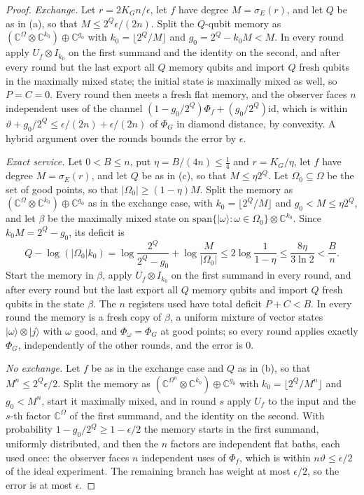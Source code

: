 \begin{proof}
\emph{Exchange.} Let $r=2K_Gn/\epsilon$, let $f$ have degree $M=\sigma_E(r)$, and let $Q$ be as in (a), so that $M\le2^Q\epsilon/(2n)$. Split the
$Q$-qubit memory as $(\mathbb C^\Omega\otimes\mathbb C^{k_0})\oplus\mathbb C^{g_0}$ with $k_0=\lfloor2^Q/M\rfloor$ and $g_0=2^Q-k_0M<M$. In every round
apply $U_f\otimes I_{k_0}$ on the first summand and the identity on the second, and after every round but the last export all $Q$ memory qubits and
import $Q$ fresh qubits in the maximally mixed state; the initial state is maximally mixed as well, so $P=C=0$. Every round then meets a fresh
flat memory, and the observer faces $n$ independent uses of the channel $(1-g_0/2^Q)\Phi_f+(g_0/2^Q)\mathrm{id}$, which is within
$\vartheta+g_0/2^Q\le\epsilon/(2n)+\epsilon/(2n)$ of $\Phi_G$ in diamond distance, by convexity. A hybrid argument over the rounds bounds the error by $\epsilon$.

\emph{Exact service.} Let $0<B\le n$, put $\eta=B/(4n)\le\frac14$ and $r=K_G/\eta$, let $f$ have degree $M=\sigma_E(r)$, and let $Q$ be as in (c), so
that $M\le\eta2^Q$. Let $\Omega_0\subseteq\Omega$ be the set of good points, so that $|\Omega_0|\ge(1-\eta)M$. Split the memory as
$(\mathbb C^\Omega\otimes\mathbb C^{k_0})\oplus\mathbb C^{g_0}$ as in the exchange case, with $k_0=\lfloor2^Q/M\rfloor$ and $g_0<M\le\eta2^Q$, and let
$\beta$ be the maximally mixed state on $\mathrm{span}\{|\omega\rangle:\omega\in\Omega_0\}\otimes\mathbb C^{k_0}$. Since $k_0M=2^Q-g_0$, its deficit is
\[
Q-\log(|\Omega_0|k_0)=\log\frac{2^Q}{2^Q-g_0}+\log\frac M{|\Omega_0|}\le2\log\frac1{1-\eta}\le\frac{8\eta}{3\ln2}<\frac Bn .
\]
Start the memory in $\beta$, apply $U_f\otimes I_{k_0}$ on the first summand in every round, and after every round but the last export all $Q$
memory qubits and import $Q$ fresh qubits in the state $\beta$. The $n$ registers used have total deficit $P+C<B$. In every round the memory is a
fresh copy of $\beta$, a uniform mixture of vector states $|\omega\rangle\otimes|j\rangle$ with $\omega$ good, and $\Phi_\omega=\Phi_G$ at good points;
so every round applies exactly $\Phi_G$, independently of the other rounds, and the error is $0$.

\emph{No exchange.} Let $f$ be as in the exchange case and $Q$ as in (b), so that $M^n\le2^Q\epsilon/2$. Split the memory as
$(\mathbb C^{\Omega^n}\otimes\mathbb C^{k_0})\oplus\mathbb C^{g_0}$ with $k_0=\lfloor2^Q/M^n\rfloor$ and $g_0<M^n$, start it maximally mixed, and in round $s$
apply $U_f$ to the input and the $s$-th factor $\mathbb C^\Omega$ of the first summand, and the identity on the second. With probability
$1-g_0/2^Q\ge1-\epsilon/2$ the memory starts in the first summand, uniformly distributed, and then the $n$ factors are independent flat baths, each
used once: the observer faces $n$ independent uses of $\Phi_f$, which is within $n\vartheta\le\epsilon/2$ of the ideal experiment. The remaining
branch has weight at most $\epsilon/2$, so the error is at most $\epsilon$.
\end{proof}


